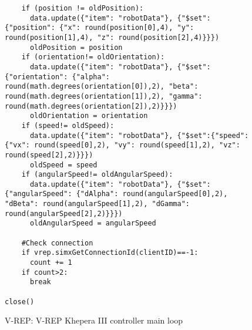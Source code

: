   \begin{figure}[H]  
  \captionsetup{justification=centering}
  \begin{verbatim}
    if (position != oldPosition): 
      data.update({"item": "robotData"}, {"$set":{"position": {"x": round(position[0],4), "y": round(position[1],4), "z": round(position[2],4)}}})
      oldPosition = position
    if (orientation!= oldOrientation):
      data.update({"item": "robotData"}, {"$set":{"orientation": {"alpha": round(math.degrees(orientation[0]),2), "beta": round(math.degrees(orientation[1]),2), "gamma": round(math.degrees(orientation[2]),2)}}})
      oldOrientation = orientation
    if (speed!= oldSpeed):
      data.update({"item": "robotData"}, {"$set":{"speed": {"vx": round(speed[0],2), "vy": round(speed[1],2), "vz": round(speed[2],2)}}})
      oldSpeed = speed
    if (angularSpeed!= oldAngularSpeed):      
      data.update({"item": "robotData"}, {"$set":{"angularSpeed": {"dAlpha": round(angularSpeed[0],2), "dBeta": round(angularSpeed[1],2), "dGamma": round(angularSpeed[2],2)}}})
      oldAngularSpeed = angularSpeed
    
    #Check connection
    if vrep.simxGetConnectionId(clientID)==-1:
      count += 1
    if count>2:
      break
      
close()   
  \end{verbatim}
  \caption{V-REP: V-REP Khepera III controller main loop}
  \end{figure}
